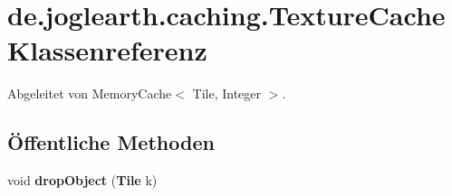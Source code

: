 \section{de.\-joglearth.\-caching.\-Texture\-Cache \-Klassenreferenz}
\label{classde_1_1joglearth_1_1caching_1_1_texture_cache}


\-Abgeleitet von \-Memory\-Cache$<$ Tile, Integer $>$.

\subsection*{Öffentliche \-Methoden}
\begin{DoxyCompactItemize}
\item 
void {\bfseries drop\-Object} ({\bf \-Tile} k)\label{classde_1_1joglearth_1_1caching_1_1_texture_cache_a524987e4c88d3ec8bec0bdd4e10ac860}

\end{DoxyCompactItemize}

